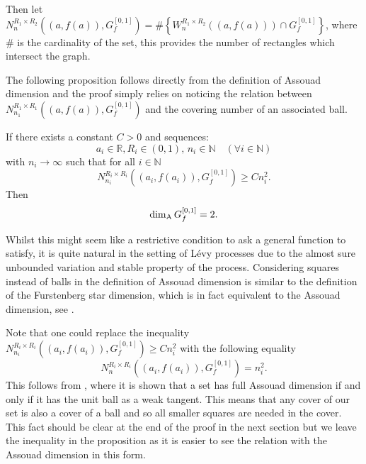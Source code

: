 Then let $N_{n}^{R_1 \times R_2 }((a,f(a)),G_f^{[0,1]})= \# \left\{ W_{n}^{R_1\times R_2}((a,f(a))) \cap G_f^{[0,1]} \right\}$, where $\#$ is the cardinality of the set, this provides the number of rectangles which intersect the graph.


The following proposition follows directly from the definition of Assouad dimension and the proof simply relies on noticing the relation between \newline$N_{n_1}^{R_1 \times R_1 }((a,f(a)),G_f^{[0,1]})$ and the covering number of an associated ball.


\begin{proposition}\label{graph}
	If there exists a constant $C>0$ and sequences:
	\[
	a_i\in \mathbb{R},R_i\in (0,1),\, n_i\in\mathbb{N} \quad (\forall i\in \mathbb{N})
	\]
	with $n_i \rightarrow \infty$ such that for all $i\in\mathbb{N}$
	\[
	N_{n_i}^{R_i \times R_i }((a_i,f(a_i)),G_f^{[0,1]})\geq C n_i^2.
	\]
	Then
	\[
	\dim_{\textup{A}} G_f^{[0,1]}=2.
	\]
\end{proposition}

Whilst this might seem like a restrictive condition to ask a general function to satisfy, it is quite natural in the setting of L\'evy processes due to the almost sure unbounded variation and stable property of the process. Considering squares instead of balls in the definition of Assouad dimension is similar to the definition of the Furstenberg star dimension, which is in fact equivalent to the Assouad dimension, see \cite{chenwuwu}.

Note that one could replace the inequality $N_{n_i}^{R_i \times R_i }((a_i,f(a_i)),G_f^{[0,1]})\geq C n_i^2$ with the following equality
\[
N_{n}^{R_i \times R_i }((a_i,f(a_i)),G_f^{[0,1]})= n_i^2.
\]
This follows from \cite[Theorem 2.4]{FY}, where it is shown that a set has full Assouad dimension if and only if it has the unit ball as a weak tangent. This means that any cover of our set is also a cover of a ball and so all smaller squares are needed in the cover. This fact should be clear at the end of the proof in the next section but we leave the inequality in the proposition as it is easier to see the relation with the Assouad dimension in this form.


